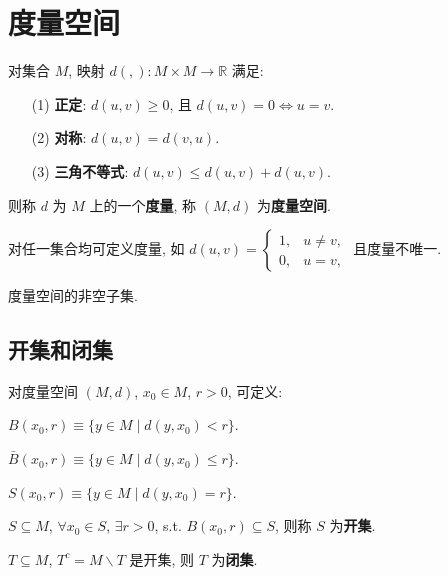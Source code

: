 \documentclass{note}
\begin{document}
\fi
\setcounter{chapter}{+11}
\chapter{度量空间}
\begin{df}[度量和度量空间]
    对集合 $M$, 映射 $d(,):M\times M\rightarrow\mathbb{R}$ 满足:
    \begin{itemize}
        \item[(1)] \textbf{正定}: $d(u,v)\geq 0$, 且 $d(u,v)=0\Longleftrightarrow u=v$.
        \item[(2)] \textbf{对称}: $d(u,v)=d(v,u)$.
        \item[(3)] \textbf{三角不等式}: $d(u,v)\leq d(u,v)+d(u,v)$.
    \end{itemize}
    则称 $d$ 为 $M$ 上的一个\textbf{度量}, 称 $(M,d)$ 为\textbf{度量空间}.
\end{df}

对任一集合均可定义度量, 如 $d(u,v)=\left\{\begin{array}{ll}
    1,&u\neq v,\\
    0,&u=v,
\end{array}\right.$ 且度量不唯一.

\begin{df}[子度量空间]
    度量空间的非空子集.
\end{df}

\section{开集和闭集}
对度量空间 $(M,d)$, $x_0\in M$, $r>0$, 可定义:
\begin{df}[开球]
    $B(x_0,r)\equiv\{y\in M\mid d(y,x_0)<r\}$.
\end{df}

\begin{df}[闭球]
    $\bar{B}(x_0,r)\equiv\{y\in M\mid d(y,x_0)\leq r\}$.
\end{df}

\begin{df}[球面]
    $S(x_0,r)\equiv\{y\in M\mid d(y,x_0)=r\}$.
\end{df}

\begin{df}[开集]
    $S\subseteq M$, $\forall x_0\in S$, $\exists r>0$, s.t. $B(x_0,r)\subseteq S$, 则称 $S$ 为\textbf{开集}.
\end{df}

\begin{df}[闭集]
    $T\subseteq M$, $T^c=M\backslash T$ 是开集, 则 $T$ 为\textbf{闭集}.
\end{df}
\end{document}
